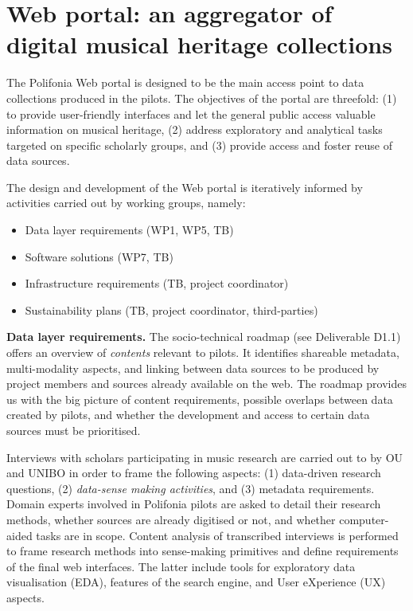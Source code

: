 \chapter{Web portal: an aggregator of digital musical heritage collections}\label{ch:portal}

The Polifonia Web portal is designed to be the main access point to data collections produced in the pilots. 
The objectives of the portal are threefold: (1) to provide user-friendly interfaces and let the general public access valuable information on musical heritage, (2) address exploratory and analytical tasks targeted on specific scholarly groups, and (3) provide access and foster reuse of data sources.

The design and development of the Web portal is iteratively informed by activities carried out by working groups, namely:

\begin{itemize}
    \item Data layer requirements (WP1, WP5, TB)
    \item Software solutions (WP7, TB)
    \item Infrastructure requirements (TB, project coordinator)
    \item Sustainability plans (TB, project coordinator, third-parties)
\end{itemize}
 
\textbf{Data layer requirements.} The socio-technical roadmap (see Deliverable D1.1) offers an overview of \emph{contents} relevant to pilots. It identifies shareable metadata, multi-modality aspects, and linking between data sources to be produced by project members and sources already available on the web. The roadmap provides us with the big picture of content requirements, possible overlaps between data created by pilots, and whether the development and access to certain data sources must be prioritised.


Interviews with scholars participating in music research are carried out to by OU and UNIBO in order to frame the following aspects: (1) data-driven research questions, (2) \emph{data-sense making activities}, and (3) metadata requirements. Domain experts involved in Polifonia pilots are asked to detail their research methods, whether sources are already digitised or not, and whether computer-aided tasks are in scope. Content analysis of transcribed interviews is performed to frame research methods into sense-making primitives and define requirements of the final web interfaces. The latter include tools for exploratory data visualisation (EDA), features of the search engine, and User eXperience (UX) aspects. 

